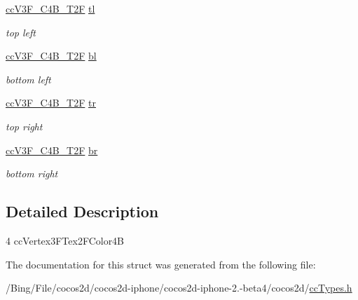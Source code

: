 \begin{DoxyCompactItemize}
\item 
\hypertarget{struct__cc_v3_f___c4_b___t2_f___quad_afa9dace8538060c750bb562b9427eef4}{\hyperlink{cc_types_8h_a674460527c4603d587ab6cef035ec755}{cc\-V3\-F\-\_\-\-C4\-B\-\_\-\-T2\-F} \hyperlink{struct__cc_v3_f___c4_b___t2_f___quad_afa9dace8538060c750bb562b9427eef4}{tl}}\label{struct__cc_v3_f___c4_b___t2_f___quad_afa9dace8538060c750bb562b9427eef4}

\begin{DoxyCompactList}\small\item\em top left \end{DoxyCompactList}\item 
\hypertarget{struct__cc_v3_f___c4_b___t2_f___quad_a39780de48d2b30f1a879d6e4811a674b}{\hyperlink{cc_types_8h_a674460527c4603d587ab6cef035ec755}{cc\-V3\-F\-\_\-\-C4\-B\-\_\-\-T2\-F} \hyperlink{struct__cc_v3_f___c4_b___t2_f___quad_a39780de48d2b30f1a879d6e4811a674b}{bl}}\label{struct__cc_v3_f___c4_b___t2_f___quad_a39780de48d2b30f1a879d6e4811a674b}

\begin{DoxyCompactList}\small\item\em bottom left \end{DoxyCompactList}\item 
\hypertarget{struct__cc_v3_f___c4_b___t2_f___quad_a3b6a9c87eddf12aef3fcdfc63d7ae204}{\hyperlink{cc_types_8h_a674460527c4603d587ab6cef035ec755}{cc\-V3\-F\-\_\-\-C4\-B\-\_\-\-T2\-F} \hyperlink{struct__cc_v3_f___c4_b___t2_f___quad_a3b6a9c87eddf12aef3fcdfc63d7ae204}{tr}}\label{struct__cc_v3_f___c4_b___t2_f___quad_a3b6a9c87eddf12aef3fcdfc63d7ae204}

\begin{DoxyCompactList}\small\item\em top right \end{DoxyCompactList}\item 
\hypertarget{struct__cc_v3_f___c4_b___t2_f___quad_abf01273031b16bf45be35dfb99b52224}{\hyperlink{cc_types_8h_a674460527c4603d587ab6cef035ec755}{cc\-V3\-F\-\_\-\-C4\-B\-\_\-\-T2\-F} \hyperlink{struct__cc_v3_f___c4_b___t2_f___quad_abf01273031b16bf45be35dfb99b52224}{br}}\label{struct__cc_v3_f___c4_b___t2_f___quad_abf01273031b16bf45be35dfb99b52224}

\begin{DoxyCompactList}\small\item\em bottom right \end{DoxyCompactList}\end{DoxyCompactItemize}


\subsection{Detailed Description}
4 cc\-Vertex3\-F\-Tex2\-F\-Color4\-B 

The documentation for this struct was generated from the following file\-:\begin{DoxyCompactItemize}
\item 
/\-Bing/\-File/cocos2d/cocos2d-\/iphone/cocos2d-\/iphone-\/2.-\/beta4/cocos2d/\hyperlink{cc_types_8h}{cc\-Types.\-h}\end{DoxyCompactItemize}
